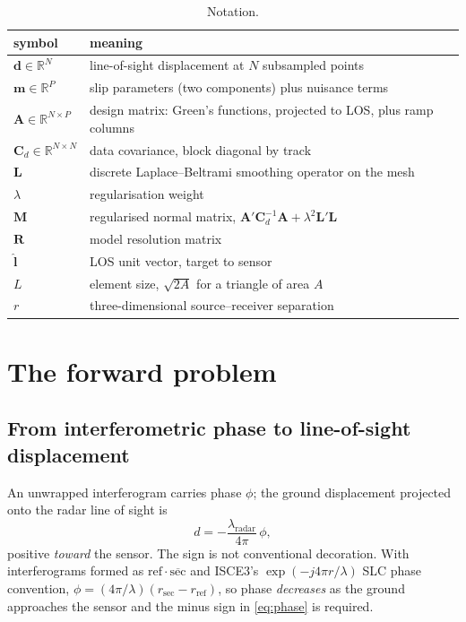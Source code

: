 \documentclass[11pt,a4paper]{article}
\newcommand{\R}{\mathbf{R}}
\newcommand{\A}{\mathbf{A}}
\newcommand{\Cd}{\mathbf{C}_d}
\newcommand{\Lop}{\mathbf{L}}
\newcommand{\M}{\mathbf{M}}
\newcommand{\bfm}{\bm{m}}
\newcommand{\bfd}{\bm{d}}
\begin{document}
\begin{table}[htbp]
\centering
\small
\begin{tabular}{ll}
\toprule
symbol & meaning \\
\midrule
$\bfd \in \mathbb{R}^{N}$ & line-of-sight displacement at $N$ subsampled points \\
$\bfm \in \mathbb{R}^{P}$ & slip parameters (two components) plus nuisance terms \\
$\A \in \mathbb{R}^{N \times P}$ & design matrix: Green's functions, projected to LOS, plus ramp columns \\
$\Cd \in \mathbb{R}^{N \times N}$ & data covariance, block diagonal by track \\
$\Lop$ & discrete Laplace--Beltrami smoothing operator on the mesh \\
$\lambda$ & regularisation weight \\
$\M$ & regularised normal matrix, $\A'\Cd^{-1}\A + \lambda^2 \Lop'\Lop$ \\
$\R$ & model resolution matrix \\
$\hat{\bm{l}}$ & LOS unit vector, target to sensor \\
$L$ & element size, $\sqrt{2A}$ for a triangle of area $A$ \\
$r$ & three-dimensional source--receiver separation \\
\bottomrule
\end{tabular}
\caption{Notation.}
\label{tab:symbols}
\end{table}

\section{The forward problem}

\subsection{From interferometric phase to line-of-sight displacement}

An unwrapped interferogram carries phase $\phi$; the ground displacement
projected onto the radar line of sight is
\begin{equation}
d = -\frac{\lambda_{\text{radar}}}{4\pi}\,\phi ,
\label{eq:phase}
\end{equation}
positive \emph{toward} the sensor. The sign is not conventional decoration. With
interferograms formed as $\text{ref}\cdot\overline{\text{sec}}$ and ISCE3's
$\exp(-j4\pi r/\lambda)$ SLC phase convention, $\phi = (4\pi/\lambda)(r_{\text{sec}} -
r_{\text{ref}})$, so phase \emph{decreases} as the ground approaches the sensor
and the minus sign in \eqref{eq:phase} is required.
\end{document}
